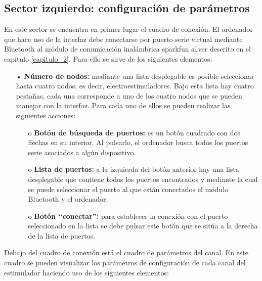\subsection{Sector izquierdo: configuración de parámetros}
En este sector se encuentra en primer lugar el cuadro de conexión. El ordenador que hace uso de la interfaz debe conectarse por puerto serie virtual mediante Bluetooth al módulo de comunicación inalámbrica sparkfun silver descrito en el capítulo \ref{capitulo_2}. Para ello se sirve de los siguientes elementos:
\begin{itemize}
\item[•] \textbf{Número de nodos:} mediante una lista desplegable es posible seleccionar hasta cuatro nodos, es decir, electroestimuladores. Bajo esta lista hay cuatro pestañas, cada una corresponde a uno de los cuatro nodos que se pueden manejar con la interfaz. Para cada uno de ellos se pueden realizar las siguientes acciones:
\begin{itemize}
\item[o] \textbf{Botón de búsqueda de puertos:} es un botón cuadrado con dos flechas en su interior. Al pulsarlo, el ordenador busca todos los puertos serie asociados a algún dispositivo.
\item[o] \textbf{Lista de puertos:} a la izquierda del botón anterior hay una lista desplegable que contiene todos los puertos encontrados y mediante la cual se puede seleccionar el puerto al que están conectados el módulo Bluetooth y el ordenador.
\item[o] \textbf{Botón ``conectar'':} para establecer la conexión con el puerto seleccionado en la lista se debe pulsar este botón que se sitúa a la derecha de la lista de puertos.
\end{itemize}
\end{itemize}

Debajo del cuadro de conexión está el cuadro de parámetros del canal. En este cuadro se pueden visualizar los parámetros de configuración de cada canal del estimulador haciendo uso de los siguientes elementos:

